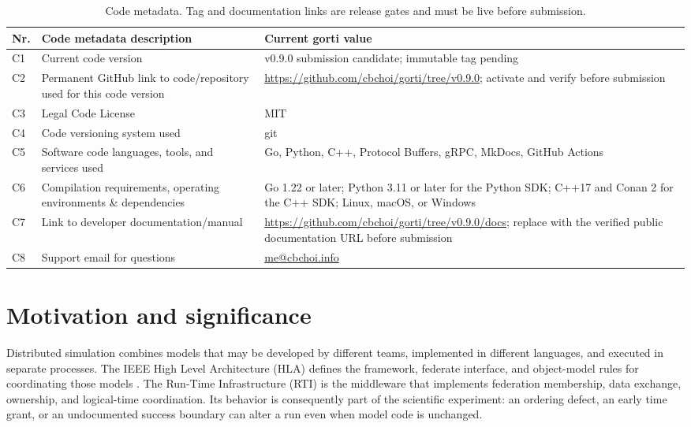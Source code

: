 \documentclass[preprint,12pt,a4paper]{elsarticle}
\begin{document}
\begin{table}[!h]
\small
\begin{tabular}{|l|p{5.1cm}|p{7.4cm}|}
\hline
\textbf{Nr.} & \textbf{Code metadata description} &
\textbf{Current gorti value} \\
\hline
C1 & Current code version & v0.9.0 submission candidate; immutable tag pending \\
\hline
C2 & Permanent GitHub link to code/repository used for this code version &
\url{https://github.com/cbchoi/gorti/tree/v0.9.0}; activate and verify before submission \\
\hline
C3 & Legal Code License & MIT \\
\hline
C4 & Code versioning system used & git \\
\hline
C5 & Software code languages, tools, and services used &
Go, Python, C++, Protocol Buffers, gRPC, MkDocs, GitHub Actions \\
\hline
C6 & Compilation requirements, operating environments \& dependencies &
Go 1.22 or later; Python 3.11 or later for the Python SDK; C++17 and Conan 2
for the C++ SDK; Linux, macOS, or Windows \\
\hline
C7 & Link to developer documentation/manual &
\url{https://github.com/cbchoi/gorti/tree/v0.9.0/docs}; replace with the
verified public documentation URL before submission \\
\hline
C8 & Support email for questions & \href{mailto:me@cbchoi.info}{me@cbchoi.info} \\
\hline
\end{tabular}
\caption{Code metadata. Tag and documentation links are release gates and must
be live before submission.}
\label{tab:metadata}
\end{table}

\section{Motivation and significance}
\label{sec:motivation}

Distributed simulation combines models that may be developed by different
teams, implemented in different languages, and executed in separate processes.
The IEEE High Level Architecture (HLA) defines the framework, federate
interface, and object-model rules for coordinating those models
\cite{ieee1516,ieee15161,ieee15162}. The Run-Time Infrastructure (RTI) is the
middleware that implements federation membership, data exchange, ownership,
and logical-time coordination. Its behavior is consequently part of the
scientific experiment: an ordering defect, an early time grant, or an
undocumented success boundary can alter a run even when model code is
unchanged.
\end{document}
